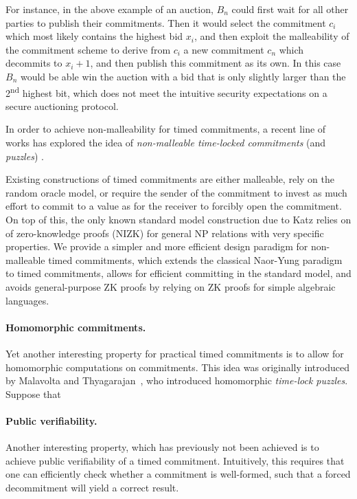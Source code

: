 For instance, in the above example of an auction, $B_n$ could first wait for all other parties to publish their commitments. Then it would select the commitment $c_i$ which most likely contains the highest bid $x_i$, and then exploit the malleability of the commitment scheme to derive from $c_i$ a new commitment $c_n$ which decommits to $x_i + 1$, and then publish this commitment as its own. In this case $B_n$ would be able win the auction with a bid that is only slightly larger than the 2\textsuperscript{nd} highest bit, which does not meet the intuitive security expectations on a secure auctioning protocol.

In order to achieve non-malleability for timed commitments, a recent line of works has explored the idea of \emph{non-malleable time-locked commitments} (and \emph{puzzles})  \cite{TCC:KatLosXu20,EPRINT:EFKP20a,EC:BDDNO21}.


Existing constructions of timed commitments are either malleable, rely on the random oracle model, or require the sender of the commitment to invest as much effort to commit to a value as for the receiver to forcibly open the commitment.  On top of this, the only known standard model construction due to Katz \etal \cite{TCC:KatLosXu20} relies on of zero-knowledge proofs (NIZK) for general NP relations with very specific properties. 
We provide a simpler and more efficient design paradigm for non-malleable timed commitments, which extends the classical Naor-Yung paradigm \cite{STOC:NaoYun90} to timed commitments, allows for efficient committing in the standard model, and avoids general-purpose ZK proofs by relying on ZK proofs for simple algebraic languages.


\paragraph{Homomorphic commitments.}
Yet another interesting property for practical timed commitments is to allow for homomorphic computations on commitments. This idea was originally introduced by Malavolta and Thyagarajan~\cite{C:MalThy19}, who introduced homomorphic \emph{time-lock puzzles}. Suppose that


\paragraph{Public verifiability.}
Another interesting property, which has previously not been achieved  is to achieve public verifiability of a timed commitment. Intuitively, this requires that one can efficiently check whether a commitment is well-formed, such that a forced decommitment will yield a correct result.

